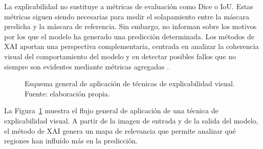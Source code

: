 La explicabilidad no sustituye a métricas de evaluación como Dice o IoU. Estas métricas siguen siendo necesarias para medir el solapamiento entre la máscara predicha y la máscara de referencia. Sin embargo, no informan sobre los motivos por los que el modelo ha generado una predicción determinada. Los métodos de XAI aportan una perspectiva complementaria, centrada en analizar la coherencia visual del comportamiento del modelo y en detectar posibles fallos que no siempre son evidentes mediante métricas agregadas \citep{hesamian2019deep,arrieta2020xai,samek2017explainableartificialintelligenceunderstanding}.

\begin{figure}[htbp]
    \centering
    \caption{Esquema general de aplicación de técnicas de explicabilidad visual. Fuente: elaboración propia.}
    \label{fig:xai_general}
\end{figure}

La Figura~\ref{fig:xai_general} muestra el flujo general de aplicación de una técnica de explicabilidad visual. A partir de la imagen de entrada y de la salida del modelo, el método de XAI genera un mapa de relevancia que permite analizar qué regiones han influido más en la predicción.